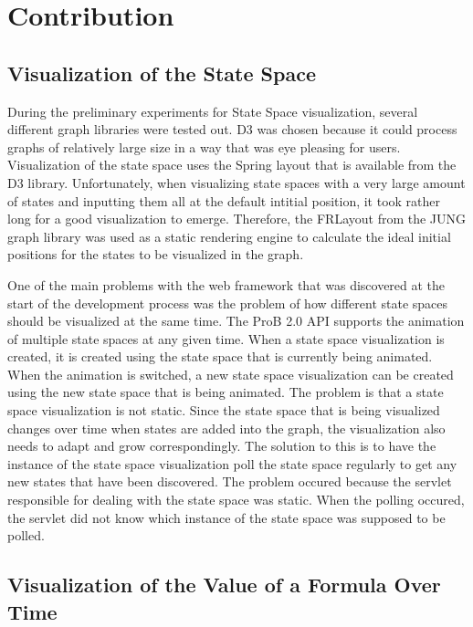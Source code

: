 \section{Contribution}

\subsection{Visualization of the State Space}

During the preliminary experiments for State Space visualization, several different graph libraries were tested out. D3 was chosen because it could process graphs of relatively large size in a way that was eye pleasing for users. Visualization of the state space uses the Spring layout that is available from the D3 library. Unfortunately, when visualizing state spaces with a very large amount of states and inputting them all at the default intitial position, it took rather long for a good visualization to emerge. Therefore, the FRLayout from the JUNG graph library was used as a static rendering engine to calculate the ideal initial positions for the states to be visualized in the graph.

One of the main problems with the web framework that was discovered at the start of the development process was the problem of how different state spaces should be visualized at the same time. The ProB 2.0 API supports the animation of multiple state spaces at any given time. When a state space visualization is created, it is created using the state space that is currently being animated. When the animation is switched, a new state space visualization can be created using the new state space that is being animated. The problem is that a state space visualization is not static. Since the state space that is being visualized changes over time when states are added into the graph, the visualization also needs to adapt and grow correspondingly. The solution to this is to have the instance of the state space visualization poll the state space regularly to get any new states that have been discovered. The problem occured because the servlet responsible for dealing with the state space was static. When the polling occured, the servlet did not know which instance of the state space was supposed to be polled.

\subsection{Visualization of the Value of a Formula Over Time}

